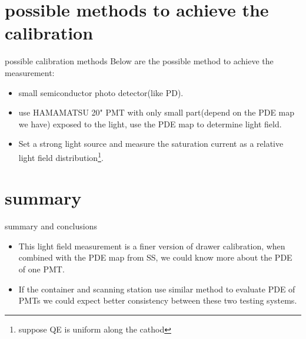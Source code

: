 \documentclass[11pt,compress,xcolor=x11names,UTF8]{beamer}
\begin{document}
%
%
\section{possible  methods to achieve the calibration}
\begin{frame}{possible  calibration methods}
Below are the possible method to achieve the measurement:
\begin{itemize}
\item small semiconductor photo detector(like PD).
\item use HAMAMATSU 20" PMT with only small part(depend on the PDE map we have) exposed to the light, use the PDE map to determine light field. 
\item Set a strong light source and measure the saturation current as  a relative light field distribution\footnote{suppose QE is uniform along the cathod}.
\end{itemize}
\end{frame}
\section{summary}

\begin{frame}{summary and conclusions}
\begin{itemize}
\item This light field measurement is a finer version of drawer calibration, when combined with the PDE map from SS, we could know more about the PDE of one PMT.

\item If the container and scanning station use similar method to evaluate PDE of PMTs we could expect better consistency between these two testing systems. 

\end{itemize}
\end{frame}
\end{document}
